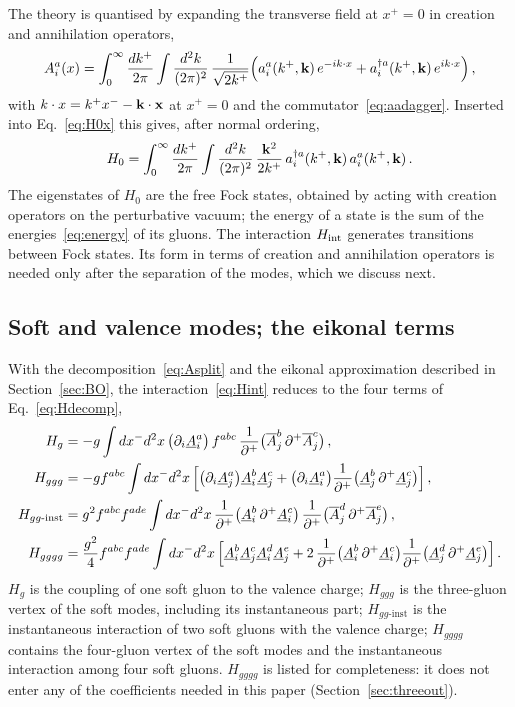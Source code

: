 The theory is quantised by expanding the transverse field at $x^+=0$ in creation and annihilation operators,
\begin{align}\label{eq:modeexp}
A^a_i(x)=\int_0^\infty\frac{dk^+}{2\pi}\int\frac{d^2k}{(2\pi)^2}\,\frac{1}{\sqrt{2k^+}}\Big(a^a_i(k^+,\mathbf{k})\,e^{-ik\cdot x}+a^{\dagger a}_i(k^+,\mathbf{k})\,e^{ik\cdot x}\Big)\,,
\end{align}
with $k\cdot x=k^+x^--\mathbf{k}\cdot\mathbf{x}$ at $x^+=0$ and the commutator~\eqref{eq:aadagger}. Inserted into Eq.~\eqref{eq:H0x} this gives, after normal ordering,
\begin{align}\label{eq:H0}
H_0=\int_0^\infty\frac{dk^+}{2\pi}\int\frac{d^2k}{(2\pi)^2}\,\frac{\mathbf{k}^2}{2k^+}\,a^{\dagger a}_i(k^+,\mathbf{k})\,a^a_i(k^+,\mathbf{k})\,.
\end{align}
The eigenstates of $H_0$ are the free Fock states, obtained by acting with creation operators on the perturbative vacuum; the energy of a state is the sum of the energies~\eqref{eq:energy} of its gluons. The interaction $H_{\rm int}$ generates transitions between Fock states. Its form in terms of creation and annihilation operators is needed only after the separation of the modes, which we discuss next.


\subsection{Soft and valence modes; the eikonal terms}

With the decomposition~\eqref{eq:Asplit} and the eikonal approximation described in Section~\ref{sec:BO}, the interaction~\eqref{eq:Hint} reduces to the four terms of Eq.~\eqref{eq:Hdecomp},
\begin{align}\label{eq:Hpieces}
H_g&=-g\int dx^-d^2x\,\big(\partial_i\underline A^a_i\big)\,f^{abc}\,\frac{1}{\partial^+}\big(\overline A^b_j\,\partial^+\overline A^c_j\big)\,,\notag\\
H_{ggg}&=-gf^{abc}\int dx^-d^2x\,\Big[\big(\partial_i\underline A^a_j\big)\underline A^b_i\underline A^c_j+\big(\partial_i\underline A^a_i\big)\frac{1}{\partial^+}\big(\underline A^b_j\,\partial^+\underline A^c_j\big)\Big]\,,\notag\\
H_{gg\text{-inst}}&=g^2f^{abc}f^{ade}\int dx^-d^2x\,\frac{1}{\partial^+}\big(\underline A^b_i\,\partial^+\underline A^c_i\big)\,\frac{1}{\partial^+}\big(\overline A^d_j\,\partial^+\overline A^e_j\big)\,,\notag\\
H_{gggg}&=\frac{g^2}{4}f^{abc}f^{ade}\int dx^-d^2x\,\Big[\underline A^b_i\underline A^c_j\underline A^d_i\underline A^e_j+2\,\frac{1}{\partial^+}\big(\underline A^b_i\,\partial^+\underline A^c_i\big)\frac{1}{\partial^+}\big(\underline A^d_j\,\partial^+\underline A^e_j\big)\Big]\,.
\end{align}
$H_g$ is the coupling of one soft gluon to the valence charge; $H_{ggg}$ is the three-gluon vertex of the soft modes, including its instantaneous part; $H_{gg\text{-inst}}$ is the instantaneous interaction of two soft gluons with the valence charge; $H_{gggg}$ contains the four-gluon vertex of the soft modes and the instantaneous interaction among four soft gluons. $H_{gggg}$ is listed for completeness: it does not enter any of the coefficients needed in this paper (Section~\ref{sec:threeout}).

